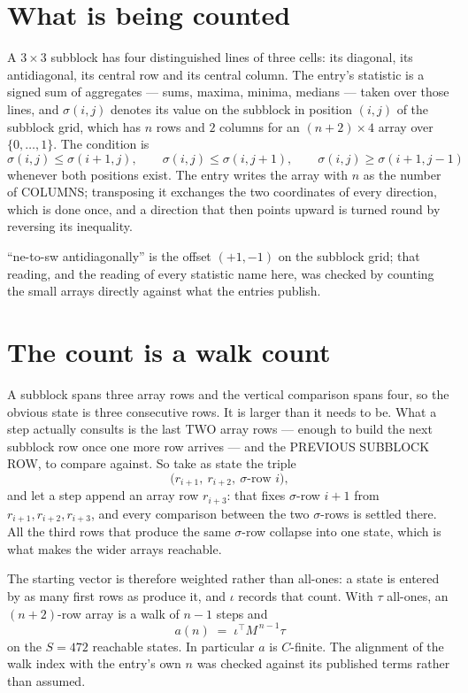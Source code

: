\documentclass[11pt,a4paper]{article}
\theoremstyle{plain}
\theoremstyle{definition}
\begin{document}
\section{What is being counted}

A $3\times3$ subblock has four distinguished lines of three cells: its diagonal, its
antidiagonal, its central row and its central column. The entry's statistic is a signed sum of
aggregates --- sums, maxima, minima, medians --- taken over those lines, and $\sigma(i,j)$
denotes its value on the subblock in position $(i,j)$ of the subblock grid, which has $n$ rows
and $2$ columns for an $(n+2)\times4$ array over $\{0,\dots,1\}$. The condition is
\[
\sigma(i,j)\le\sigma(i+1,j),\qquad \sigma(i,j)\le\sigma(i,j+1),\qquad \sigma(i,j)\ge\sigma(i+1,j-1)
\]
whenever both positions exist. The entry writes the array with $n$ as the number of COLUMNS; transposing it exchanges the two coordinates of every direction, which is done once, and a direction that then points upward is turned round by reversing its inequality.

``ne-to-sw antidiagonally'' is the offset $(+1,-1)$ on the subblock grid; that reading, and
the reading of every statistic name here, was checked by counting the small arrays directly
against what the entries publish.

\section{The count is a walk count}

A subblock spans three array rows and the vertical comparison spans four, so the obvious state
is three consecutive rows. It is larger than it needs to be. What a step actually consults is
the last TWO array rows --- enough to build the next subblock row once one more row arrives ---
and the PREVIOUS SUBBLOCK ROW, to compare against. So take as state the triple
\[
\bigl(r_{i+1},\ r_{i+2},\ \sigma\text{-row }i\bigr),
\]
and let a step append an array row $r_{i+3}$: that fixes $\sigma$-row $i+1$ from
$r_{i+1},r_{i+2},r_{i+3}$, and every comparison between the two $\sigma$-rows is settled
there. All the third rows that produce the same $\sigma$-row collapse into one state, which is
what makes the wider arrays reachable.

The starting vector is therefore weighted rather than all-ones: a state is entered by as many
first rows as produce it, and $\iota$ records that count. With $\tau$ all-ones, an
$(n+2)$-row array is a walk of $n-1$ steps and
\[
a(n)\;=\;\iota^{\!\top}M^{\,n-1}\tau
\]
on the $S=472$ reachable states. In particular $a$ is $C$-finite. The alignment of the walk
index with the entry's own $n$ was checked against its published terms rather than assumed.
\end{document}
